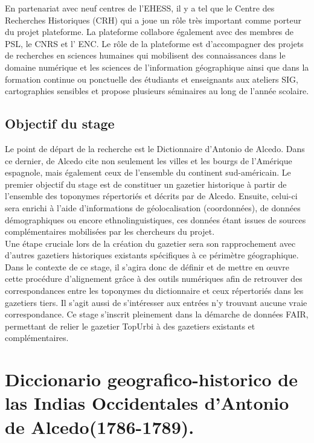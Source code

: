 \documentclass[a4paper,12pt,twoside]{book}
\begin{document}
En partenariat avec neuf centres de l’EHESS, il y a tel que le Centre des Recherches Historiques (\Gls{CRH}) qui a joue un rôle très important comme porteur du projet plateforme. La plateforme collabore également avec des membres de \Gls{PSL}, le \Gls{CNRS} et l’ \Gls{ENC}. Le rôle de la plateforme est d’accompagner des projets de recherches en sciences humaines qui mobilisent des connaissances dans le domaine numérique et les sciences de l’information géographique ainsi que dans la formation continue ou ponctuelle des étudiants et enseignants aux ateliers \Gls{SIG}, cartographies sensibles et propose plusieurs séminaires au long de l’année scolaire. \\


\section{Objectif du stage}

Le point de départ de la recherche est le Dictionnaire d’Antonio de Alcedo. Dans ce dernier, de Alcedo cite non seulement les villes et les bourgs de l’Amérique espagnole, mais également ceux de l'ensemble du continent sud-américain. Le premier objectif du stage est de constituer un gazetier historique à partir de l’ensemble des toponymes répertoriés et décrits par de Alcedo. Ensuite, celui-ci sera enrichi à l’aide d’informations de géolocalisation (coordonnées), de données démographiques ou encore ethnolinguistiques, ces données étant issues de sources complémentaires mobilisées par les chercheurs du projet. \\

Une étape cruciale lors de la création du gazetier sera son rapprochement avec d’autres gazetiers historiques existants spécifiques à ce périmètre géographique. Dans le contexte de ce stage, il s’agira donc de définir et de mettre en œuvre cette procédure d’alignement grâce à des outils numériques afin de retrouver des correspondances entre les toponymes du dictionnaire et ceux répertoriés dans les gazetiers tiers. Il s'agit aussi de s'intéresser aux entrées n'y trouvant aucune vraie correspondance. Ce stage s'inscrit pleinement dans la démarche de données \Gls{FAIR}, permettant de relier le gazetier TopUrbi à des gazetiers existants et complémentaires.\\
	

	\chapter{Diccionario geografico-historico de las Indias Occidentales d’Antonio de Alcedo(1786-1789).}
	
\end{document}
